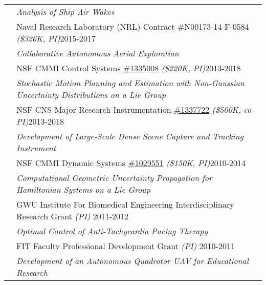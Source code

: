\documentclass[10pt]{article}
\begin{document}
\begin{tabularx}{\textwidth}{>{\setlength{\hsize}{0.5cm}}X X}
& \quad\textit{Analysis of Ship Air Wakes} \vspace*{0.08cm}\\
%     
& Naval Research Laboratory (NRL) Contract \#N00173-14-F-0584 \textit{(\$326K, PI)}\hfill 2015-2017 \\
& \quad\textit{Collaborative Autonomous Aerial Exploration} \vspace*{0.08cm}\\
%     
& NSF CMMI Control Systems \href{http://www.nsf.gov/awardsearch/showAward?AWD_ID=1335008}{\#1335008} \textit{(\$220K, PI)}\hfill 2013-2018 \\
& \quad\textit{Stochastic Motion Planning and Estimation with Non-Gaussian Uncertainty Distributions on a Lie Group} \vspace*{0.08cm}\\
%
& NSF CNS Major Research Instrumentation \href{http://www.nsf.gov/awardsearch/showAward?AWD_ID=1337722}{\#1337722} \textit{(\$500K, co-PI)}\hfill 2013-2018 \\
& \quad\textit{Development of Large-Scale Dense Scene Capture and Tracking Instrument} \vspace*{0.08cm}\\
%
& NSF CMMI Dynamic Systems \href{http://www.nsf.gov/awardsearch/showAward.do?AwardNumber=1029551}{\#1029551} \textit{(\$150K, PI)}\hfill 2010-2014 \\
& \quad\textit{Computational Geometric Uncertainty Propagation for Hamiltonian Systems on a Lie Group} \vspace*{0.08cm}\\
%
& GWU Institute For Biomedical Engineering
Interdisciplinary Research Grant \textit{(PI)}
 \hfill 2011-2012 \\
& \quad\textit{Optimal Control of Anti-Tachycardia Pacing Therapy}\vspace*{0.08cm}\\
%
& FIT Faculty Professional Development Grant \textit{(PI)}
 \hfill 2010-2011 \\
& \quad\textit{Development of an Autonomous Quadrotor UAV for Educational Research}\vspace*{0.08cm}\\
%
%
\end{tabularx}
\end{document}
